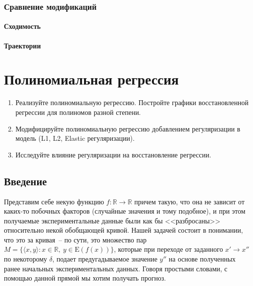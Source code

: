 \documentclass[12pt, a4paper, oneside, final]{article}
\begin{document}
	\subsubsection*{Сравнение модификаций}
	\paragraph{Сходимость}
	\paragraph{Траектории}
	\newpage
	\section*{Полиномиальная регрессия}
	\begin{enumerate}[1.]
		\item
		Реализуйте полиномиальную регрессию.
		Постройте графики восстановленной регрессии для полиномов разной степени.
		\item
		Модифицируйте полиномиальную регрессию добавлением регуляризации в модель (L1, L2, Elastic регуляризации).
		\item
		Исследуйте влияние регуляризации на восстановление регрессии.
	\end{enumerate}
	\subsection*{Введение}
	Представим себе некую функцию $f : \mathbb{R} \to \mathbb{R}$ причем такую, что она не зависит от каких-то побочных факторов (случайные значения и тому подобное), и при этом получаемые экспериментальные данные были как бы <<разбросаны>> относительно некой обобщающей кривой.
	Нашей задачей состоит в понимании, что это за кривая~-- по сути, это множество пар $M = \{\langle x, y\rangle : x \in \mathbb{R}, ~ y \in \mathrm{E}{(f(x))}\}$, которые при переходе от заданного $x' \to x''$ по некоторому $\delta$, подает предугадываемое значение $y''$ на основе полученных ранее начальных экспериментальных данных.
	Говоря простыми словами, с помощью данной прямой мы хотим получать прогноз.
\end{document}
